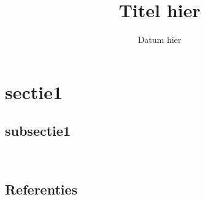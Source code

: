 \documentclass{article}
\title{Titel hier}
\author{} %
\date{Datum hier} %
\begin{document}




\tableofcontents
\newpage


\section{sectie1}

\subsection{subsectie1} %

\\

\subsection{Referenties}
\begingroup
\renewcommand{\section}[2]{}%

\endgroup
\end{document}
